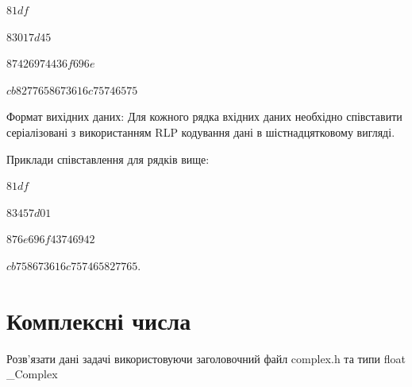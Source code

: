 \documentclass[]{article}
\begin{document}
\begin{enumerate}
$81df$

$83017d45$

$87426974436f696e$

$cb8277658673616c75746575$

Формат вихідних даних:
Для кожного рядка вхідних даних необхідно співставити серіалізовані з використанням RLP кодування дані в шістнадцятковому вигляді.

Приклади співставлення для рядків вище: 

$81df$

$83457d01$

$876e696f43746942$

$cb758673616c757465827765$.


\end{enumerate}

\section{Комплексні числа}

Розв'язати дані задачі
використовуючи заголовочний файл complex.h та типи float \_Complex
\end{document}

